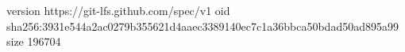 version https://git-lfs.github.com/spec/v1
oid sha256:3931e544a2ac0279b355621d4aaec3389140ec7c1a36bbca50bdad50ad895a99
size 196704
